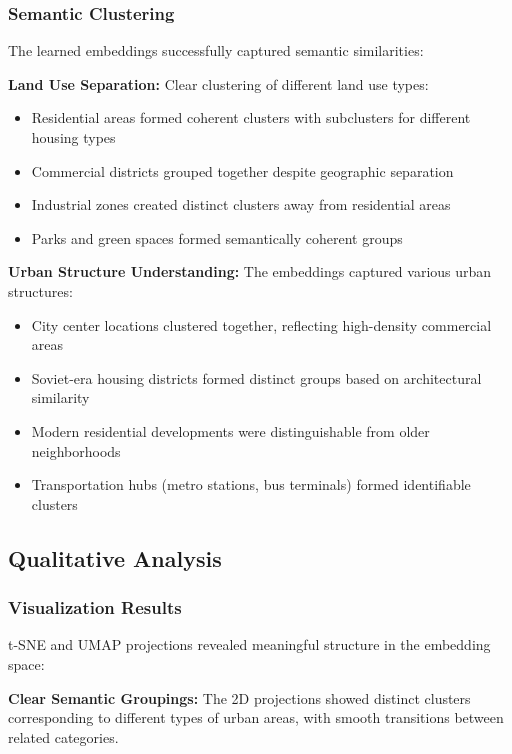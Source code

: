 \subsubsection{Semantic Clustering}

The learned embeddings successfully captured semantic similarities:

\textbf{Land Use Separation:} Clear clustering of different land use types:
\begin{itemize}
    \item Residential areas formed coherent clusters with subclusters for different housing types
    \item Commercial districts grouped together despite geographic separation
    \item Industrial zones created distinct clusters away from residential areas
    \item Parks and green spaces formed semantically coherent groups
\end{itemize}

\textbf{Urban Structure Understanding:} The embeddings captured various urban structures:
\begin{itemize}
    \item City center locations clustered together, reflecting high-density commercial areas
    \item Soviet-era housing districts formed distinct groups based on architectural similarity
    \item Modern residential developments were distinguishable from older neighborhoods
    \item Transportation hubs (metro stations, bus terminals) formed identifiable clusters
\end{itemize}

\subsection{Qualitative Analysis}

\subsubsection{Visualization Results}

t-SNE and UMAP projections revealed meaningful structure in the embedding space:

\textbf{Clear Semantic Groupings:} The 2D projections showed distinct clusters corresponding to different types of urban areas, with smooth transitions between related categories.

